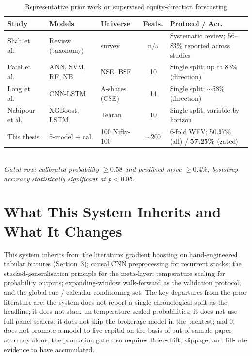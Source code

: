 \begin{table}[H]
\centering
\caption{Representative prior work on supervised equity-direction forecasting}
\label{tab:indian_priors}
\renewcommand{\arraystretch}{1.2}
\footnotesize
\begin{tabularx}{\textwidth}{@{}l l l c X@{}}
\toprule
\textbf{Study} & \textbf{Models} & \textbf{Universe} & \textbf{Feats.} & \textbf{Protocol / Acc.} \\
\midrule
Shah et al.~\cite{shah2019taxonomy}    & Review (taxonomy) & survey         & n/a       & Systematic review; 56--83\% reported across studies \\
Patel et al.~\cite{patel2015nse}       & ANN, SVM, RF, NB  & NSE, BSE       & 10        & Single split; up to 83\% (direction) \\
Long et al.~\cite{long2019deep}        & CNN-LSTM          & A-shares (CSE) & 14        & Single split; $\sim$58\% (direction) \\
Nabipour et al.~\cite{nabipour2020deep}& XGBoost, LSTM     & Tehran         & 10        & Single split; variable by horizon \\
\midrule
This thesis                            & 5-model + cal.    & 100 Nifty-100  & $\sim$200 & 6-fold WFV; 50.97\% (all) / \textbf{57.25\%} (gated) \\
\bottomrule
\end{tabularx}\\[4pt]
\footnotesize\itshape Gated row: calibrated probability $\ge 0.58$ and predicted move $\ge 0.4\%$; bootstrap accuracy statistically significant at $p<0.05$.
\end{table}

\section{What This System Inherits and What It Changes}

This system inherits from the literature: gradient boosting on hand-engineered tabular features (Section~3); causal CNN preprocessing for recurrent stacks; the stacked-generalisation principle for the meta-layer; temperature scaling for probability outputs; expanding-window walk-forward as the validation protocol; and the global-cue / calendar conditioning set. The key departures from the prior literature are: the system does not report a single chronological split as the headline; it does not stack un-temperature-scaled probabilities; it does not use full-panel scalers; it does not skip the brokerage model in the backtest; and it does not promote a model to live capital on the basis of out-of-sample paper accuracy alone; the promotion gate also requires Brier-drift, slippage, and fill-rate evidence to have accumulated.
